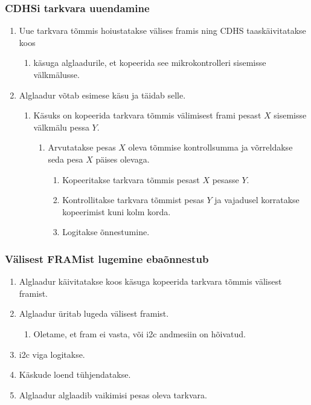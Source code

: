 \documentclass[12pt,a4paper]{article}
\begin{document}
\subsubsection{CDHSi tarkvara uuendamine}
\label{sec:usecase:upgrade}
\begin{enumerate}
	\item Uue tarkvara tõmmis hoiustatakse välises \gls{fram}is ning CDHS
		taaskäivitatakse koos
		\begin{enumerate}
			\item käsuga alglaadurile, et kopeerida see mikrokontrolleri
				sisemisse välkmälusse.
		\end{enumerate}
	\item Alglaadur võtab esimese käsu ja täidab selle.
		\begin{enumerate}
			\item Käsuks on kopeerida tarkvara tõmmis välimisest \gls{fram}i pesast \(X\)
				sisemisse välkmälu pessa \(Y\).
				\begin{enumerate}
					\item Arvutatakse pesas \(X\) oleva tõmmise kontrollsumma ja
						võrreldakse seda pesa \(X\) päises olevaga.
						\begin{enumerate}
							\item Kopeeritakse tarkvara tõmmis pesast \(X\) pesasse \(Y\).
							\item Kontrollitakse tarkvara tõmmist pesas \(Y\) ja
								vajadusel korratakse kopeerimist kuni kolm
								korda.
							\item Logitakse õnnestumine.
						\end{enumerate}
				\end{enumerate}
		\end{enumerate}
\end{enumerate}

\subsubsection{Välisest FRAMist lugemine ebaõnnestub}
\label{sec:usecase:framerror}
\begin{enumerate}
	\item Alglaadur käivitatakse koos käsuga kopeerida tarkvara tõmmis välisest
		\gls{fram}ist.
	\item Alglaadur üritab lugeda välisest \gls{fram}ist.
		\begin{enumerate}
		\item Oletame, et \gls{fram} ei vasta, või \gls{i2c} andmesiin on hõivatud.
		\end{enumerate}
	\item \gls{i2c} viga logitakse.
	\item Käskude loend tühjendatakse.
	\item Alglaadur alglaadib vaikimisi pesas oleva tarkvara.
\end{enumerate}
\end{document}
